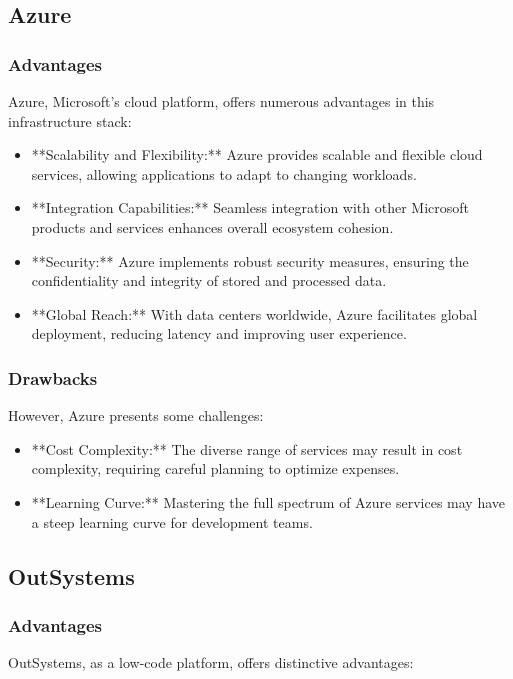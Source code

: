     \subsection{Azure}
    
    \subsubsection{Advantages}
    Azure, Microsoft's cloud platform, offers numerous advantages in this infrastructure stack:
    
    \begin{itemize}
        \item **Scalability and Flexibility:** Azure provides scalable and flexible cloud services, allowing applications to adapt to changing workloads.
        \item **Integration Capabilities:** Seamless integration with other Microsoft products and services enhances overall ecosystem cohesion.
        \item **Security:** Azure implements robust security measures, ensuring the confidentiality and integrity of stored and processed data.
        \item **Global Reach:** With data centers worldwide, Azure facilitates global deployment, reducing latency and improving user experience.
    \end{itemize}
    
    \subsubsection{Drawbacks}
    However, Azure presents some challenges:
    
    \begin{itemize}
        \item **Cost Complexity:** The diverse range of services may result in cost complexity, requiring careful planning to optimize expenses.
        \item **Learning Curve:** Mastering the full spectrum of Azure services may have a steep learning curve for development teams.
    \end{itemize}
    
    \subsection{OutSystems}
    
    \subsubsection{Advantages}
    OutSystems, as a low-code platform, offers distinctive advantages:
    
